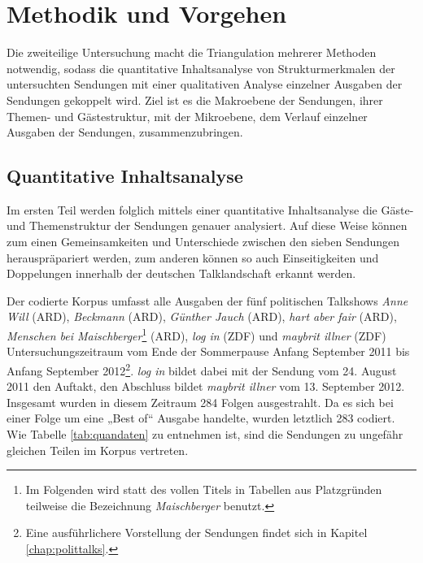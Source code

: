 \chapter{Methodik und Vorgehen}

Die zweiteilige Untersuchung macht die Triangulation mehrerer Methoden notwendig, sodass die quantitative Inhaltsanalyse von Strukturmerkmalen der untersuchten Sendungen mit einer qualitativen Analyse einzelner Ausgaben der Sendungen gekoppelt wird. Ziel ist es die Makroebene der Sendungen, ihrer Themen- und Gästestruktur, mit der Mikroebene, dem Verlauf einzelner Ausgaben der Sendungen, zusammenzubringen.

\section{Quantitative Inhaltsanalyse}

Im ersten Teil werden folglich mittels einer quantitative Inhaltsanalyse die Gäste- und Themenstruktur der Sendungen genauer analysiert. Auf diese Weise können zum einen Gemeinsamkeiten und Unterschiede zwischen den sieben Sendungen herauspräpariert werden, zum anderen können so auch Einseitigkeiten und Doppelungen innerhalb der deutschen Talklandschaft erkannt werden.

Der codierte Korpus umfasst alle Ausgaben der fünf politischen Talkshows \textit{Anne Will} (ARD), \textit{Beckmann} (ARD),\textit{ Günther Jauch} (ARD), \textit{hart aber fair} (ARD), \textit{Menschen bei Maischberger}\footnote{Im Folgenden wird statt des vollen Titels in Tabellen aus Platzgründen teilweise die Bezeichnung \textit{Maischberger} benutzt.} (ARD), \textit{log in} (ZDF) und \textit{maybrit illner} (ZDF) Untersuchungszeitraum vom Ende der Sommerpause Anfang September 2011 bis Anfang September 2012\footnote{Eine ausführlichere Vorstellung der Sendungen findet sich in Kapitel \vref{chap:polittalks}.}. \textit{log in} bildet dabei mit der Sendung vom 24. August 2011 den Auftakt, den Abschluss bildet \textit{maybrit illner} vom 13. September 2012. Insgesamt wurden in diesem Zeitraum 284 Folgen ausgestrahlt. Da es sich bei einer Folge um eine „Best of“ Ausgabe handelte, wurden letztlich 283 codiert. Wie Tabelle \vref{tab:quandaten} zu entnehmen ist, sind die Sendungen zu ungefähr gleichen Teilen im Korpus vertreten.

